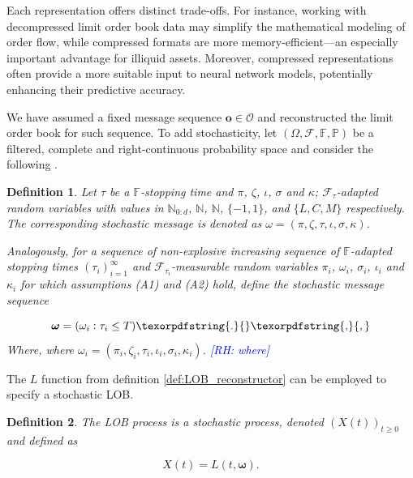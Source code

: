 \documentclass[10pt,a4paper,oneside]{article}
\newcommand{\N}{\mathbb{N}}
\newcommand{\Prob}{\mathbb{P}}
\newcommand{\Fil}{\mathbb{F}}
\newcommand{\SigAl}{\mathcal{F}}
\newcommand{\rh}[1]{\textcolor{blue}{\textsf{[RH: #1]}}}
\newtheorem{definition}{Definition}
\providecommand{\DIFaddtex}[1]{{\protect\color{blue} \sf #1}} %
\providecommand{\DIFdeltex}[1]{{\protect\color{red} \scriptsize #1}} %
\providecommand{\DIFaddbegin}{} %
\providecommand{\DIFaddend}{} %
\providecommand{\DIFdelbegin}{} %
\providecommand{\DIFdelend}{} %
\providecommand{\DIFadd}[1]{\texorpdfstring{\DIFaddtex{#1}}{#1}} %
\providecommand{\DIFdel}[1]{\texorpdfstring{\DIFdeltex{#1}}{}} %
\newcommand{\DIFscaledelfig}{0.5}
\newlength{\DIFdelgraphicswidth} %
\newlength{\DIFdelgraphicsheight} %
\newcommand{\DIFaddincludegraphics}[2][]{{\color{blue}\fbox{\DIFOincludegraphics[#1]{#2}}}} %
\newcommand{\DIFdelincludegraphics}[2][]{%
\sbox{\DIFdelgraphicsbox}{\DIFOincludegraphics[#1]{#2}}%
\settoboxwidth{\DIFdelgraphicswidth}{\DIFdelgraphicsbox} %
\settoboxtotalheight{\DIFdelgraphicsheight}{\DIFdelgraphicsbox} %
\scalebox{\DIFscaledelfig}{%
\parbox[b]{\DIFdelgraphicswidth}{\usebox{\DIFdelgraphicsbox}\\[-\baselineskip] \rule{\DIFdelgraphicswidth}{0em}}\llap{\resizebox{\DIFdelgraphicswidth}{\DIFdelgraphicsheight}{%
\setlength{\unitlength}{\DIFdelgraphicswidth}%
\begin{picture}(1,1)%
\thicklines\linethickness{2pt} %
{\color[rgb]{1,0,0}\put(0,0){\framebox(1,1){}}}%
{\color[rgb]{1,0,0}\put(0,0){\line( 1,1){1}}}%
{\color[rgb]{1,0,0}\put(0,1){\line(1,-1){1}}}%
\end{picture}%
}\hspace*{3pt}}} %
} %
\DeclareRobustCommand{\DIFaddbegin}{\DIFOaddbegin \let\includegraphics\DIFaddincludegraphics} %
\DeclareRobustCommand{\DIFaddend}{\DIFOaddend \let\includegraphics\DIFOincludegraphics} %
\DeclareRobustCommand{\DIFdelbegin}{\DIFOdelbegin \let\includegraphics\DIFdelincludegraphics} %
\DeclareRobustCommand{\DIFdelend}{\DIFOaddend \let\includegraphics\DIFOincludegraphics} %
\begin{document}
Each representation offers distinct trade-offs. For instance, working with decompressed limit order book data may simplify the mathematical modeling of order flow, while compressed formats are more memory-efficient—an especially important advantage for illiquid assets. Moreover, compressed representations often provide a more suitable input to neural network models, potentially enhancing their predictive accuracy.


We have assumed a fixed message sequence $\mathbf{o} \in \mathcal{O}$ and reconstructed the limit order book for such sequence. To add stochasticity, let $(\Omega, \SigAl, \Fil, \Prob)$ be a filtered, complete and right-continuous probability space and consider the following 
\DIFdelbegin \DIFdel{.
}\DIFdelend 

\begin{definition}
Let $\tau$ be a $\Fil$-stopping time and $\pi$, $\zeta$, $\iota$, $\sigma$ and $\kappa$; $\SigAl_{\tau}$-adapted random variables with values in $\N_{0:d}$, $\N$, $\N$, $\{-1, 1\}$, and $\{L, C, M\}$ respectively. The corresponding stochastic message is denoted as  $\omega = (\pi, \zeta, \tau, \iota, \sigma, \kappa)$.

Analogously, for a sequence of non-explosive increasing sequence of $\Fil$-adapted stopping times $(\tau_i)^{\infty}_{i = 1}$ and $\SigAl_{\tau_i}$-measurable random variables $\pi_i$, $\omega_i$, $\sigma_i$, $\iota_i$ and $\kappa_i$ for which assumptions (A1) and (A2) hold, define the stochastic message sequence

\begin{equation*}
\boldsymbol{\omega} = (\omega_i : \tau_i \leq T)\DIFdelbegin \DIFdel{.
}\DIFdelend \DIFaddbegin \DIFadd{,
}\DIFaddend \end{equation*}
\DIFdelbegin \DIFdel{Where, }\DIFdelend \DIFaddbegin \DIFadd{where }\DIFaddend $\omega_i = (\pi_i, \zeta_i, \tau_i, \iota_i, \sigma_i, \kappa_i)$. 
\DIFdelbegin \DIFdel{\rh{where} 
}\DIFdelend \label{def:stochastic_messages}
\end{definition}

The $L$ function from definition \ref{def:LOB_reconstructor} can be employed to specify a stochastic LOB.

\begin{definition} The LOB process is a stochastic process, denoted $(X(t))_{t \geq 0}$ and defined as
\DIFaddbegin 

\DIFaddend \begin{equation*}
X(t) = L(t, \boldsymbol{\omega}).
\end{equation*}
\label{def:lob_process}
\end{definition}
\end{document}

